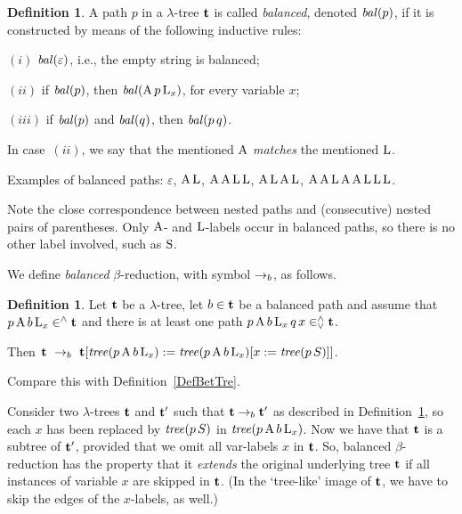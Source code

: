 \documentclass{article}
\theoremstyle{plain}
\theoremstyle{definition}
\newtheorem{Def}[The]{Definition}
\begin{document}
\begin{Def}\label{DefBalPat}
A path $p$ in a $\lambda$-tree ${\bf t}$ is called {\em balanced\/}, denoted ${\it bal}(p)$, if it is constructed by means of the following inductive rules:

$(i)$ ${\it bal}(\varepsilon)$, i.e., the empty string is balanced;

$(ii)$ if ${\it bal}(p)$, then ${\it bal}({\rm A} \, p \, {\rm L}_x)$, for every variable $x$;

$(iii)$ if ${\it bal}(p)$ and ${\it bal}(q)$, then ${\it bal}(p \, q)$.

\noindent In case~$(ii)$, we say that the mentioned ${\rm A}$ {\it matches\/} the mentioned ${{\rm L}}$.
\end{Def}

Examples of balanced paths: $\varepsilon$, ${\rm A} \, {\rm L}$, ${\rm A} \, {\rm A} \, {\rm L} \, {\rm L}$, ${\rm A} \, {\rm L} \, {\rm A} \, {\rm L}$, ${\rm A} \, {\rm A} \, {\rm L} \, {\rm A} \, {\rm A} \, {\rm L} \, {\rm L} \, {\rm L}$.

Note the close correspondence between nested paths and (consecutive) nested pairs of parentheses. Only ${\rm A}$- and ${\rm L}$-labels occur in balanced paths, so there is no other label involved, such as ${\rm S}$.

\smallskip

We define {\it balanced\/} $\beta$-reduction, with symbol $\rightarrow_b$, as follows.

\begin{Def}\label{DefBalRed}
Let ${\bf t}$ be a $\lambda$-tree, let $b \in {\bf t}$ be a balanced path and assume that $p \, {\rm A} \, b \, {\rm L}_x \in^\wedge {\bf t}$ and there is at least one path $p \, {\rm A} \, b \, {\rm L}_x \, q \, x \in^\wedge_\vee {\bf t}$.

Then ${\bf t} ~\rightarrow_b~ {\bf t}[{\it tree}(p \, {\rm A} \, b \, {\rm L}_x) := {\it tree}(p \, {\rm A} \, b \, {\rm L}_x)[x := {\it tree}(p \, S)]]$.
\end{Def}


Compare this with Definition~\ref{DefBetTre}.

Consider two $\lambda$-trees ${\bf t}$ and ${\bf t}'$ such that ${\bf t} \rightarrow_b {\bf t}'$ as described in Definition~\ref{DefBalRed}, so each $x$ has been replaced by ${\it tree}(p \, S)$ in ${\it tree}(p \, {\rm A} \, b \, {\rm L}_x)$. Now we have that ${\bf t}$ is a subtree of ${{\bf t}}'$, provided that we omit all var-labels $x$ in ${\bf t}$. So, balanced $\beta$-reduction has the property that it {\it extends\/} the original underlying tree ${\bf t}$ if all instances of variable $x$ are skipped in ${\bf t}$. (In the `tree-like' image of ${\bf t}$, we have to skip the edges of the $x$-labels, as well.)
\end{document}
